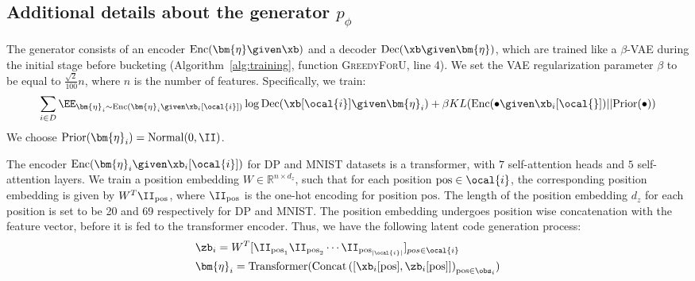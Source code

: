 \documentclass[letterpaper]{article}
\begin{document}


\subsection{Additional details about the generator $p_{\phi}$}
 The generator consists of an encoder $\text{Enc}(\bm{\eta}  \given \xb)$ and a decoder $\text{Dec}(\xb \given \bm{\eta})$, which are trained like a $\beta$-VAE during the initial stage before bucketing (Algorithm~\ref{alg:training}, function \textsc{GreedyForU}, line 4). We set the VAE regularization parameter $\beta$ to be equal to $\frac{\sqrt{2}}{100}n$, where $n$ is the number of features. Specifically, we train:
\begin{align}
\sum_{i\in D}\EE_{\bm{\eta}_i\sim\text{Enc}(\bm{\eta}_i \given \xb_i[\ocal{i}])} \log \text{Dec} (\xb[\ocal{i}]\given \bm{\eta}_i) +  \beta KL(\text{Enc}(\bullet\given\xb_i[\ocal{}]) || \text{Prior}(\bullet))
\end{align}
We choose $\text{Prior}(\bm{\eta}_i) = \text{Normal} (0,\II)$.

The encoder $\text{Enc}(\bm{\eta}_i \given \xb_i[\ocal{i}])$ for DP and MNIST datasets is a transformer, with $7$ self-attention heads and $5$ self-attention layers. We train a position embedding $W \in \mathbb{R}^{n \times d_z}$, such that for each position $\text{pos}\in \ocal{i}$, the corresponding position embedding is given by $W^T \II_{\text{pos}}$, where $\II_{\text{pos}}$ is the one-hot encoding for position $\text{pos}$. The length of the position embedding $d_z$ for each position is set to be 20 and 69 respectively for DP and MNIST. The position embedding undergoes position wise concatenation with the feature vector, before it is fed to the transformer encoder.
Thus, we have the following latent code generation process:
\begin{align}
&\zb_i = W^T[\II_{\text{pos}_1} \II_{\text{pos}_2} \cdots \II_{\text{pos}_{|\ocal{i}|}}]_{pos \in \ocal{i}}\\
&\bm{\eta}_i=  \text{Transformer}(\text{Concat}\left([\xb_i[\text{pos}],\zb_i[\text{pos}]]\right)_{\text{pos} \in \obs_i})
\end{align}
\end{document}
